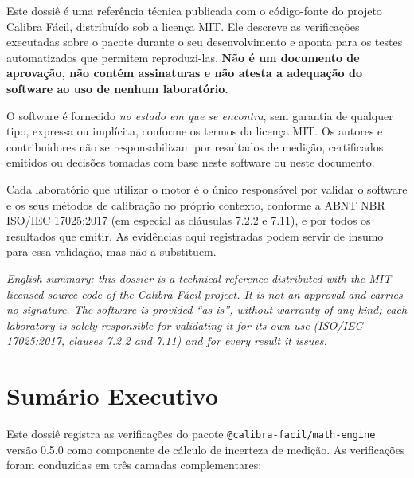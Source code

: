 \documentclass[11pt,a4paper]{article}
\newcommand{\docVersion}{0.5.0}
\begin{document}
Este dossiê é uma referência técnica publicada com o código-fonte do projeto Calibra Fácil, distribuído sob a licença MIT. Ele descreve as verificações executadas sobre o pacote durante o seu desenvolvimento e aponta para os testes automatizados que permitem reproduzi-las. \textbf{Não é um documento de aprovação, não contém assinaturas e não atesta a adequação do software ao uso de nenhum laboratório.}

O software é fornecido \emph{no estado em que se encontra}, sem garantia de qualquer tipo, expressa ou implícita, conforme os termos da licença MIT. Os autores e contribuidores não se responsabilizam por resultados de medição, certificados emitidos ou decisões tomadas com base neste software ou neste documento.

Cada laboratório que utilizar o motor é o único responsável por validar o software e os seus métodos de calibração no próprio contexto, conforme a ABNT NBR ISO/IEC 17025:2017 (em especial as cláusulas 7.2.2 e 7.11), e por todos os resultados que emitir. As evidências aqui registradas podem servir de insumo para essa validação, mas não a substituem.

\vspace{0.2cm}
{\small\itshape English summary: this dossier is a technical reference distributed with the MIT-licensed source code of the Calibra Fácil project. It is not an approval and carries no signature. The software is provided ``as is'', without warranty of any kind; each laboratory is solely responsible for validating it for its own use (ISO/IEC 17025:2017, clauses 7.2.2 and 7.11) and for every result it issues.}

\tableofcontents

\clearpage

\section{Sumário Executivo}

Este dossiê registra as verificações do pacote \texttt{@calibra-facil/math-engine} versão \docVersion{} como componente de cálculo de incerteza de medição. As verificações foram conduzidas em três camadas complementares:
\end{document}
